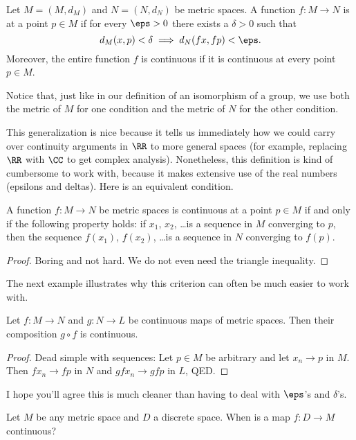 \begin{definition}
	Let $M = (M, d_M)$ and $N = (N, d_N)$ be metric spaces.
	A function $f : M \to N$ is  at a point $p \in M$
	if for every $\eps > 0$ there exists a $\delta > 0$ such that
	\[ d_M(x,p) < \delta \implies d_N(fx, fp) < \eps. \]
	Moreover, the entire function $f$ is continuous if it is continuous at every point $p \in M$.
\end{definition}
Notice that, just like in our definition of an isomorphism of a group,
we use both the metric of $M$ for one condition
and the metric of $N$ for the other condition.

This generalization is nice because it tells us immediately how we could carry over continuity arguments in $\RR$ to more general spaces (for example, replacing $\RR$ with $\CC$ to get complex analysis).
Nonetheless, this definition is kind of cumbersome to work with, because it makes extensive use of the real numbers (epsilons and deltas).
Here is an equivalent condition.
\begin{theorem}
	A function $f : M \to N$ be metric spaces is continuous at a point $p \in M$
	if and only if the following property holds:
	if $x_1$, $x_2$, \dots is a sequence in $M$ converging to $p$,
	then the sequence $f(x_1)$, $f(x_2)$, \dots is a sequence in $N$ converging to $f(p)$.
\end{theorem}
\begin{proof}
	Boring and not hard.
	We do not even need the triangle inequality.
\end{proof}

The next example illustrates why this criterion can often be much easier to work with.
\begin{proposition}
	Let $f : M \to N$ and $g : N \to L$ be continuous maps of metric spaces.
	Then their composition $g \circ f$ is continuous.
\end{proposition}
\begin{proof}
	Dead simple with sequences:
	Let $p \in M$ be arbitrary and let $x_n \to p$ in $M$.
	Then $fx_n \to fp$ in $N$ and $gfx_n \to gfp$ in $L$, QED.
\end{proof}
I hope you'll agree this is much cleaner than having to deal with $\eps$'s and $\delta$'s.

\begin{ques}
	Let $M$ be any metric space and $D$ a discrete space.
	When is a map $f : D \to M$ continuous?
\end{ques}



